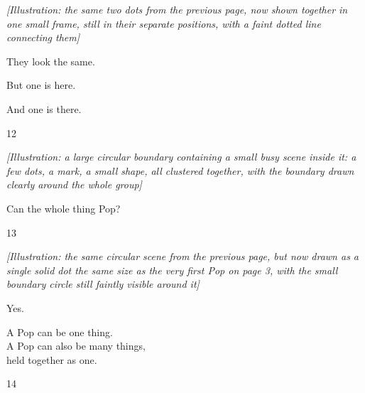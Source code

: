 \documentclass[12pt]{book}
\newcommand{\artnote}[1]{{\color{gray!70}\small\itshape [Illustration: #1]}\par\vspace{0.3in}}
\newcommand{\bigline}[1]{{\Huge #1}\par}
\newcommand{\pagenum}[1]{\vfill{\color{gray!50}\footnotesize #1}}
\newcommand{\sprollpage}{\newpage\vspace*{0.4in}}
\begin{document}
\sprollpage
\begin{center}
\vspace*{0.6in}
\artnote{the same two dots from the previous page, now shown together in one small frame, still in their separate positions, with a faint dotted line connecting them}
\vspace{0.4in}
\bigline{They look the same.}\vspace{0.15in}
\bigline{But one is here.}\vspace{0.15in}
\bigline{And one is there.}
\end{center}
\pagenum{12}

\sprollpage
\begin{center}
\vspace*{0.5in}
\artnote{a large circular boundary containing a small busy scene inside it: a few dots, a mark, a small shape, all clustered together, with the boundary drawn clearly around the whole group}
\vspace{0.4in}
\bigline{Can the whole thing Pop?}
\end{center}
\pagenum{13}

\sprollpage
\begin{center}
\vspace*{0.5in}
\artnote{the same circular scene from the previous page, but now drawn as a single solid dot the same size as the very first Pop on page 3, with the small boundary circle still faintly visible around it}
\vspace{0.4in}
\bigline{Yes.}\vspace{0.15in}
{\Large A Pop can be one thing.}\\[0.1in]
{\Large A Pop can also be many things,}\\[0.1in]
{\Large held together as one.}
\end{center}
\pagenum{14}
\end{document}
